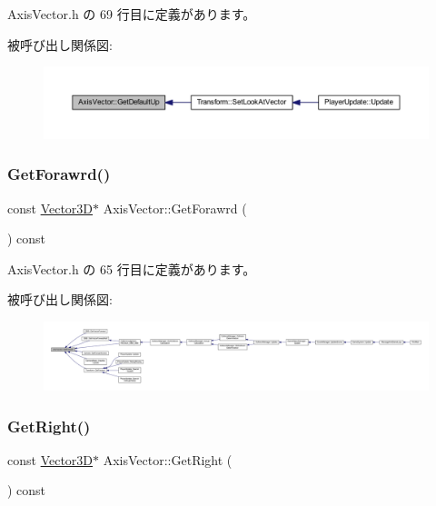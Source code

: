  Axis\+Vector.\+h の 69 行目に定義があります。

被呼び出し関係図\+:
\nopagebreak
\begin{figure}[H]
\begin{center}
\leavevmode
\includegraphics[width=350pt]{class_axis_vector_a32f68ef0864e7b589d3c1996a61e11fc_icgraph}
\end{center}
\end{figure}
\mbox{\label{class_axis_vector_a79013d5b090ce9232d57f528f18e982e}} 
\subsubsection{\texorpdfstring{Get\+Forawrd()}{GetForawrd()}}
{\footnotesize\ttfamily const \mbox{\hyperlink{class_vector3_d}{Vector3D}}$\ast$ Axis\+Vector\+::\+Get\+Forawrd (\begin{DoxyParamCaption}{ }\end{DoxyParamCaption}) const\hspace{0.3cm}{\ttfamily [inline]}}



 Axis\+Vector.\+h の 65 行目に定義があります。

被呼び出し関係図\+:
\nopagebreak
\begin{figure}[H]
\begin{center}
\leavevmode
\includegraphics[width=350pt]{class_axis_vector_a79013d5b090ce9232d57f528f18e982e_icgraph}
\end{center}
\end{figure}
\mbox{\label{class_axis_vector_a1d4f944d118d6f999c516dbdc0827a39}} 
\subsubsection{\texorpdfstring{Get\+Right()}{GetRight()}}
{\footnotesize\ttfamily const \mbox{\hyperlink{class_vector3_d}{Vector3D}}$\ast$ Axis\+Vector\+::\+Get\+Right (\begin{DoxyParamCaption}{ }\end{DoxyParamCaption}) const\hspace{0.3cm}{\ttfamily [inline]}}



